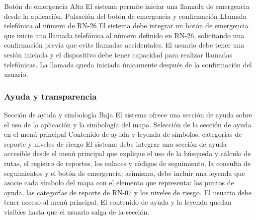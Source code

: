   {Botón de emergencia}%
  {Alta}%
  {El sistema permite iniciar una llamada de emergencia desde la aplicación.}%
  {Pulsación del botón de emergencia y confirmación}%
  {Llamada telefónica al número de RN-26}%
  {El sistema debe integrar un botón de emergencia que inicie una llamada telefónica al número definido en RN-26, solicitando una confirmación previa que evite llamadas accidentales.}%
  {El usuario debe tener una sesión iniciada y el dispositivo debe tener capacidad para realizar llamadas telefónicas.}%
  {La llamada queda iniciada únicamente después de la confirmación del usuario.}%

\subsubsection{Ayuda y transparencia}

  {Sección de ayuda y simbología}%
  {Baja}%
  {El sistema ofrece una sección de ayuda sobre el uso de la aplicación y la simbología del mapa.}%
  {Selección de la sección de ayuda en el menú principal}%
  {Contenido de ayuda y leyenda de símbolos, categorías de reporte y niveles de riesgo}%
  {El sistema debe integrar una sección de ayuda accesible desde el menú principal que explique el uso de la búsqueda y cálculo de rutas, el registro de reportes, los enlaces y códigos de seguimiento, la consulta de seguimientos y el botón de emergencia; asimismo, debe incluir una leyenda que asocie cada símbolo del mapa con el elemento que representa: los puntos de ayuda, las categorías de reporte de RN-07 y los niveles de riesgo.}%
  {El usuario debe tener acceso al menú principal.}%
  {El contenido de ayuda y la leyenda quedan visibles hasta que el usuario salga de la sección.}%